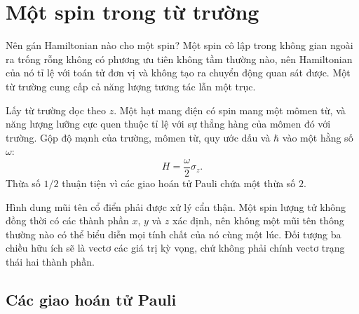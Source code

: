 \begin{classroomqa}
\end{classroomqa}

\section{Một spin trong từ trường}

Nên gán Hamiltonian nào cho một spin? Một spin cô lập trong không gian ngoài ra trống rỗng không có phương ưu tiên không tầm thường nào, nên Hamiltonian của nó tỉ lệ với toán tử đơn vị và không tạo ra chuyển động quan sát được. Một từ trường cung cấp cả năng lượng tương tác lẫn một trục.

Lấy từ trường dọc theo \(z\). Một hạt mang điện có spin mang một mômen từ, và năng lượng lưỡng cực quen thuộc tỉ lệ với sự thẳng hàng của mômen đó với trường. Gộp độ mạnh của trường, mômen từ, quy ước dấu và \(\hbar\) vào một hằng số \(\omega\):
\begin{equation}
H=\frac{\omega}{2}\sigma_z.
\label{eq:l5-z-hamiltonian}
\end{equation}
Thừa số \(1/2\) thuận tiện vì các giao hoán tử Pauli chứa một thừa số \(2\).

Hình dung mũi tên cổ điển phải được xử lý cẩn thận. Một spin lượng tử không đồng thời có các thành phần \(x\), \(y\) và \(z\) xác định, nên không một mũi tên thông thường nào có thể biểu diễn mọi tính chất của nó cùng một lúc. Đối tượng ba chiều hữu ích sẽ là vectơ các giá trị kỳ vọng, chứ không phải chính vectơ trạng thái hai thành phần.

\subsection{Các giao hoán tử Pauli}

